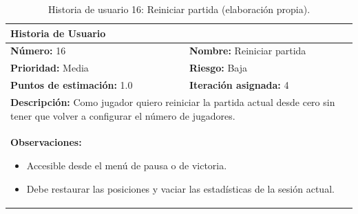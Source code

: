 \begin{table}[H]
\centering
\caption{Historia de usuario 16: Reiniciar partida (elaboración propia).\label{tab:hu16}}
\renewcommand{\arraystretch}{1.5}
\begin{tabular}{|p{}|p{}|}
\hline
\multicolumn{2}{|l|}{\textbf{Historia de Usuario}} \\
\hline
\textbf{Número:} 16 & \textbf{Nombre:} Reiniciar partida \\
\hline
\textbf{Prioridad:} Media & \textbf{Riesgo:} Baja \\
\hline
\textbf{Puntos de estimación:} 1.0 & \textbf{Iteración asignada:} 4 \\
\hline
\multicolumn{2}{|p{0.945\textwidth}|}{\textbf{Descripción:} Como jugador quiero reiniciar la partida actual desde cero sin tener que volver a configurar el número de jugadores.} \\
\hline
\multicolumn{2}{|p{0.945\textwidth}|}{\textbf{Observaciones:}
\vspace{-0.5em}
\begin{itemize}
    \setlength\itemsep{0em}
    \item Accesible desde el menú de pausa o de victoria.
    \item Debe restaurar las posiciones y vaciar las estadísticas de la sesión actual.
\end{itemize}
\vspace{-1em}
} \\
\hline
\end{tabular}
\end{table}

